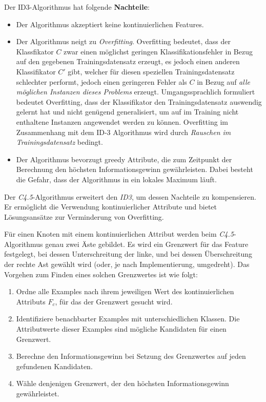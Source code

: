 Der ID3-Algorithmus hat folgende \textbf{Nachteile}:
\begin{itemize}
\item Der Algorithmus akzeptiert keine kontinuierlichen Features.\cite[S. 72]{machine_mitchell}
\item Der Algorithmus neigt zu \emph{Overfitting}. Overfitting bedeutet, dass der Klassfikator $C$ zwar einen möglichst geringen Klassifikationsfehler in Bezug auf den gegebenen Trainingsdatensatz erzeugt, es jedoch einen anderen Klassifikator $C'$ gibt, welcher für diesen speziellen Trainingsdatensatz schlechter performt, jedoch einen geringeren Fehler als $C$ in Bezug auf \emph{alle möglichen Instanzen dieses Problems} erzeugt. Umgangssprachlich formuliert bedeutet Overfitting, dass der Klassifikator den Trainingsdatensatz \glqq auswendig gelernt hat\grqq{} und nicht genügend generalisiert, um auf im Training nicht enthaltene Instanzen angewendet werden zu können. Overfitting im Zusammenhang mit dem ID-3 Algorithmus wird durch \emph{Rauschen im Trainingsdatensatz} bedingt.
\item Der Algorithmus bevorzugt greedy Attribute, die zum Zeitpunkt der Berechnung den höchsten Informationsgewinn gewährleisten. Dabei besteht die Gefahr, dass der Algorithmus in ein lokales Maximum läuft.\cite[S. 66 - 70]{machine_mitchell}
\end{itemize}

Der \emph{C4.5}-Algorithmus erweitert den \emph{ID3}, um dessen Nachteile zu kompensieren. Er ermöglicht die Verwendung kontinuierlicher Attribute und bietet Lösungsansätze zur Verminderung von Overfitting.

Für einen Knoten mit einem kontinuierlichen Attribut werden beim \emph{C4.5}-Algorithmus genau zwei Äste gebildet. Es wird ein Grenzwert für das Feature festgelegt, bei dessen Unterschreitung der linke, und bei dessen Überschreitung der rechte Ast gewählt wird (oder, je nach Implementierung, umgedreht). Das Vorgehen zum Finden eines solchen Grenzwertes ist wie folgt:

\begin{enumerate}
\item Ordne alle Examples nach ihrem jeweiligen Wert des kontinuierlichen Attributs $F_c$, für das der Grenzwert gesucht wird. 
\item Identifiziere benachbarter Examples mit unterschiedlichen Klassen. Die Attributwerte dieser Examples sind mögliche Kandidaten für einen Grenzwert.
\item Berechne den Informationsgewinn bei Setzung des Grenzwertes auf jeden gefundenen Kandidaten. 
\item Wähle denjenigen Grenzwert, der den höchsten Informationsgewinn gewährleistet.\cite[S. 73]{machine_mitchell}
\end{enumerate}

